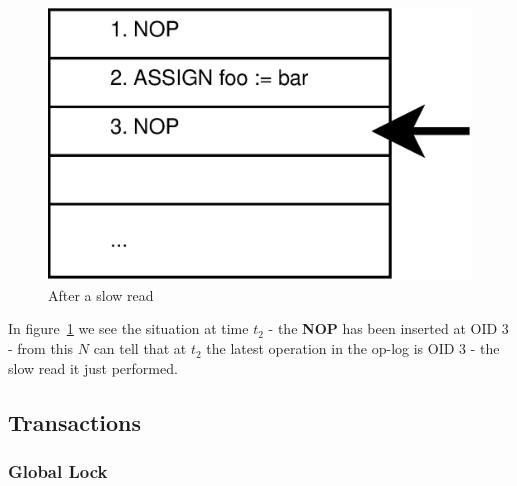 \documentclass[12pt,twoside,notitlepage]{report}
\newcommand{\op}[1]  {{\bf #1}}         %
\begin{document}
\begin{figure}[htb]
\centering
\includegraphics[scale=0.5]{figs/op-log-slow-read-2.eps}
\caption{\label{fig:op-log-slow-read-2}After a slow read}
\end{figure}

In figure~\ref{fig:op-log-slow-read-2} we see the situation at time $t_2$ - the \op{NOP} has been
inserted at OID 3 - from this $N$ can tell that at $t_2$ the latest operation in the op-log is OID
3 - the slow read it just performed.

\subsection{Transactions}

\subsubsection{Global Lock}
\end{document}
